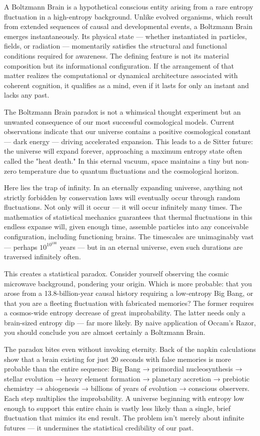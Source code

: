 A Boltzmann Brain is a hypothetical conscious entity arising from a rare entropy fluctuation in a high-entropy background. Unlike evolved organisms, which result from extended sequences of causal and developmental events, a Boltzmann Brain emerges instantaneously. Its physical state — whether instantiated in particles, fields, or radiation — momentarily satisfies the structural and functional conditions required for awareness. The defining feature is not its material composition but its informational configuration. If the arrangement of that matter realizes the computational or dynamical architecture associated with coherent cognition, it qualifies as a mind, even if it lasts for only an instant and lacks any past.

The Boltzmann Brain paradox is not a whimsical thought experiment but an unwanted consequence of our most successful cosmological models. Current observations indicate that our universe contains a positive cosmological constant — dark energy — driving accelerated expansion. This leads to a de Sitter future: the universe will expand forever, approaching a maximum entropy state often called the "heat death." In this eternal vacuum, space maintains a tiny but non-zero temperature due to quantum fluctuations and the cosmological horizon.

Here lies the trap of infinity. In an eternally expanding universe, anything not strictly forbidden by conservation laws will eventually occur through random fluctuations. Not only will it occur — it will occur infinitely many times. The mathematics of statistical mechanics guarantees that thermal fluctuations in this endless expanse will, given enough time, assemble particles into any conceivable configuration, including functioning brains. The timescales are unimaginably vast — perhaps $10^{10^{100}}$ years — but in an eternal universe, even such durations are traversed infinitely often.

This creates a statistical paradox. Consider yourself observing the cosmic microwave background, pondering your origin. Which is more probable: that you arose from a 13.8-billion-year causal history requiring a low-entropy Big Bang, or that you are a fleeting fluctuation with fabricated memories? The former requires a cosmos-wide entropy decrease of great improbability. The latter needs only a brain-sized entropy dip — far more likely. By naive application of Occam's Razor, you should conclude you are almost certainly a Boltzmann Brain.

The paradox bites even without invoking eternity. Back of the napkin calculations show that a brain existing for just 20 seconds with false memories is  more probable than the entire sequence: Big Bang → primordial nucleosynthesis → stellar evolution → heavy element formation → planetary accretion → prebiotic chemistry → abiogenesis → billions of years of evolution → conscious observers. Each step multiplies the improbability. A universe beginning with entropy low enough to support this entire chain is vastly less likely than a single, brief fluctuation that mimics its end result. The problem isn't merely about infinite futures — it undermines the statistical credibility of our past.

